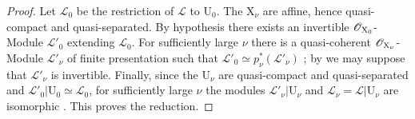 \begin{proof}
Let $\mathscr{L}_0$ be the restriction of $\mathscr{L}$ to $\mathrm{U}_0$. The $\mathrm{X}_\nu$ are affine, hence quasi-compact and quasi-separated. By hypothesis there exists an invertible $\mathscr{O}_{\mathrm{X}_0}$-Module $\mathscr{L}'_0$ extending $\mathscr{L}_0$. For sufficiently large $\nu$ there is a quasi-coherent $\mathscr{O}_{\mathrm{X}_\nu}$-Module $\mathscr{L}'_\nu$ of finite presentation such that $\mathscr{L}'_0\simeq p_\nu^*(\mathscr{L}'_\nu)$ ; by  we may suppose that $\mathscr{L}'_\nu$ is invertible. Finally, since the $\mathrm{U}_\nu$ are quasi-compact and quasi-separated and $\mathscr{L}'_0|\mathrm{U}_0\simeq\mathscr{L}_0$, for sufficiently large $\nu$ the modules $\mathscr{L}'_\nu|\mathrm{U}_\nu$ and $\mathscr{L}_\nu=\mathscr{L}|\mathrm{U}_\nu$ are isomorphic . This proves the reduction.


\end{proof}
